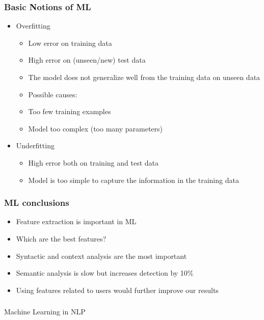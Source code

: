 \begin{frame}[fragile]\frametitle{Basic Notions of ML}
  \begin{itemize}
    \item  Overfitting
      \begin{itemize}
    \item   Low error on training data
    \item   High error on (unseen/new) test data
    \item   The model does not generalize well from the training data on unseen data
    \item   Possible causes:
    \item   Too few training examples
    \item   Model too complex (too many parameters)
  \end{itemize}
    \item  Underfitting
      \begin{itemize}
    \item    High error both on training and test data
    \item    Model is too simple to capture the information in the training data
  \end{itemize}
  \end{itemize}
\end{frame}

\begin{frame}[fragile]\frametitle{ML conclusions}
  \begin{itemize}
    \item  Feature extraction is important in ML
    \item Which are the best features?
    \item Syntactic and context analysis are the most important
    \item Semantic analysis is slow but increases detection by 10\%
    \item Using features related to users would further improve our results
      \end{itemize}
\end{frame}


\begin{frame}[fragile]\frametitle{}

\begin{center}
{\Large Machine Learning in NLP}
\end{center}
\end{frame}

